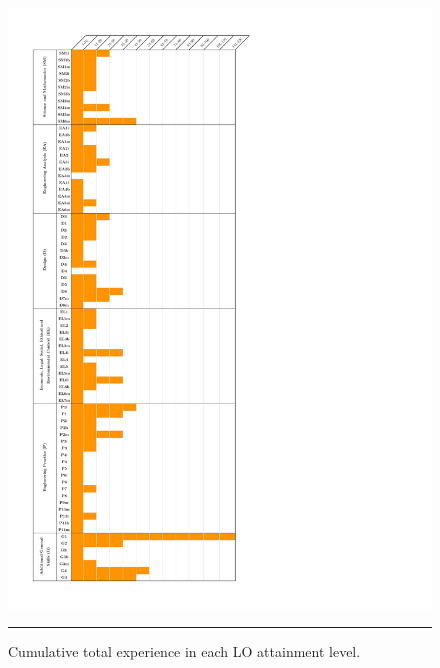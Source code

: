 \begin{figure}[htbp]
	\centering
	\includegraphics[height=\textheight]{Appendices/Cumulative_LOs_Vertical_Orange_Small.pdf}
	\rule{0.7\textwidth}{0.5pt} %
	\caption{Cumulative total experience in each LO attainment level.}
	\label{fig:cum_LOs}
\end{figure}



